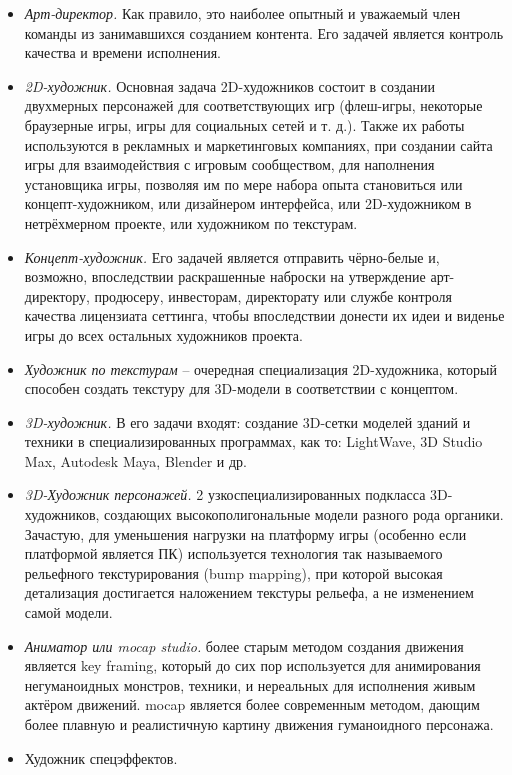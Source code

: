 \begin{itemize}
    \item \emph{Арт-директор.} Как правило, это наиболее опытный и уважаемый член команды из занимавшихся
        созданием контента. Его задачей является контроль качества и времени исполнения.
    \item \emph{2D-художник.} Основная задача 2D-художников состоит в создании двухмерных персонажей для
        соответствующих игр (флеш-игры, некоторые браузерные игры, игры для социальных сетей и т. д.). Также
        их работы используются в рекламных и маркетинговых компаниях, при создании сайта игры для
        взаимодействия с игровым сообществом, для наполнения установщика игры, позволяя им по мере набора
        опыта становиться или концепт-художником, или дизайнером интерфейса, или 2D-художником в
        нетрёхмерном проекте, или художником по текстурам.
    \item \emph{Концепт-художник.} Его задачей является отправить чёрно-белые и, возможно, впоследствии
        раскрашенные наброски на утверждение арт-директору, продюсеру, инвесторам, директорату или службе
        контроля качества лицензиата сеттинга, чтобы впоследствии донести их идеи и виденье игры до всех
        остальных художников проекта.
    \item \emph{Художник по текстурам} -- очередная специализация 2D-художника, который способен создать
        текстуру для 3D-модели в соответствии с концептом.
    \item \emph{3D-художник.} В его задачи входят: создание 3D-сетки моделей зданий и техники в
        специализированных программах, как то: LightWave, 3D Studio Max, Autodesk Maya, Blender и др.
    \item \emph{3D-Художник персонажей.} 2 узкоспециализированных подкласса 3D-художников, создающих
        высокополигональные модели разного рода органики. Зачастую, для уменьшения нагрузки на платформу
        игры (особенно если платформой является ПК) используется технология так называемого рельефного
        текстурирования (bump mapping), при которой высокая детализация достигается наложением текстуры
        рельефа, а не изменением самой модели.
    \item \emph{Аниматор или mocap studio.} более старым методом создания движения является key framing,
        который до сих пор используется для анимирования негуманоидных монстров, техники, и нереальных для
        исполнения живым актёром движений. mocap является более современным методом, дающим более плавную и
        реалистичную картину движения гуманоидного персонажа.
    \item Художник спецэффектов.
\end{itemize}

